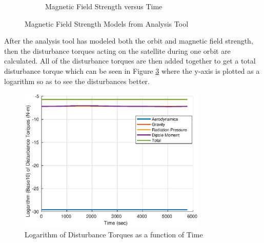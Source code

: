\documentclass[conf]{new-aiaa}
\begin{document}
\begin{figure}[H]
\begin{subfigure}[b]{0.45\textwidth}
         \caption{Magnetic Field Strength versus Time}
         \label{fig:Mag_Time}
     \end{subfigure}
        \caption{Magnetic Field Strength Models from Analysis Tool}
        \label{fig:Mag_Models}
\end{figure}

After the analysis tool has modeled both the orbit and magnetic field strength, then the disturbance torques acting on the satellite during one orbit are calculated. All of the disturbance torques are then added together to get a total disturbance torque which can be seen in Figure \ref{fig:Dist_Tor} where the y-axis is plotted as a logarithm so as to see the disturbances better. 
\begin{figure}[H]
\begin{center}
    \includegraphics[width=0.8\textwidth]{Figures/Disturbances.eps}
    \caption{Logarithm of Disturbance Torques as a function of Time}
    \label{fig:Dist_Tor}
\end{center}
\end{figure}
\end{document}
